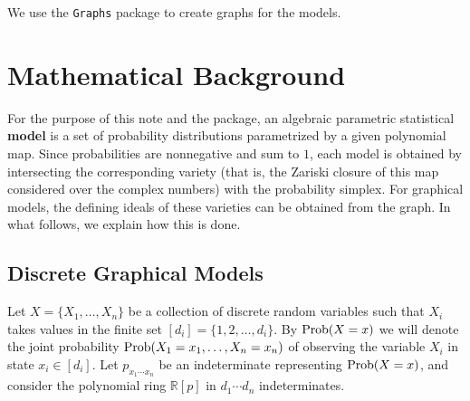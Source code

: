 \documentclass{article}
\theoremstyle{definition}
\newcommand{\R}{\mathbb{R}}
\newcommand{\Prob}{{\rm Prob}}
\begin{document}
We use  the {\tt Graphs} package to create graphs for the models.

\section{Mathematical Background}

For the purpose of this note and the package, an algebraic parametric statistical {\bf model} is a set of probability distributions parametrized by a given polynomial map.
Since probabilities are nonnegative and sum to $1$, each model is obtained by intersecting the corresponding variety (that is, the Zariski closure of this map considered over  the complex numbers) with the probability simplex. For graphical models, the defining ideals of these varieties can be obtained from the graph. 
 In what follows, we explain how this is done. %


\subsection{Discrete Graphical Models}
\label{sec:discreteBackground}
Let $X=\{X_1, \ldots, X_n\}$ be a collection of discrete random variables such that $X_i$ takes values in the finite set $[d_i] = \{1, 2, \ldots, d_i\}$. 
By $\Prob(X=x)$ we will denote the joint probability $\Prob(X_1=x_1,\dots,X_n=x_n)$ of observing the variable $X_i$ in state $x_i\in [d_i]$. 
Let $p_{x_1\cdots x_n}$ be an indeterminate representing $\Prob(X=x)$, and consider the polynomial ring $\R[p]$ in $d_1\cdots d_n$ indeterminates.
\end{document}
